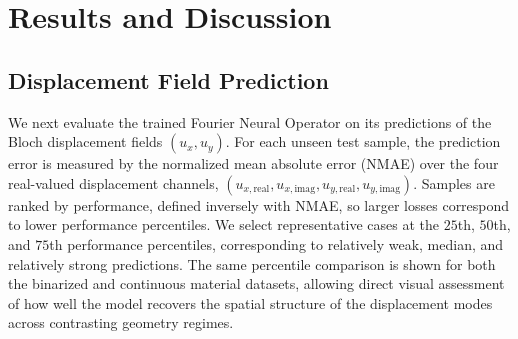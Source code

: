 \documentclass[preprint,review,12pt,numafflabel]{elsarticle}
\begin{document}


\section{Results and Discussion}


\subsection{Displacement Field Prediction}
We next evaluate the trained Fourier Neural Operator on its predictions of the Bloch displacement fields $(u_x,u_y)$. For each unseen test sample, the prediction error is measured by the normalized mean absolute error (NMAE) over the four real-valued displacement channels, $(u_{x,\mathrm{real}},u_{x,\mathrm{imag}},u_{y,\mathrm{real}},u_{y,\mathrm{imag}})$. Samples are ranked by performance, defined inversely with NMAE, so larger losses correspond to lower performance percentiles. We select representative cases at the $25$th, $50$th, and $75$th performance percentiles, corresponding to relatively weak, median, and relatively strong predictions. The same percentile comparison is shown for both the binarized and continuous material datasets, allowing direct visual assessment of how well the model recovers the spatial structure of the displacement modes across contrasting geometry regimes.
\end{document}
